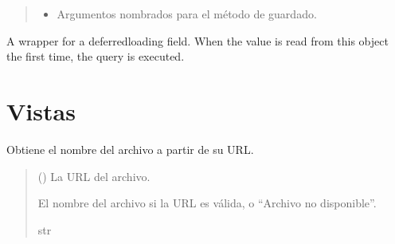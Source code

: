 \documentclass[letterpaper,10pt,spanish]{sphinxmanual}
\begin{document}
\begin{fulllineitems}
\begin{fulllineitems}
\begin{quote}
\begin{description}
\begin{itemize}
\item {} 
\sphinxAtStartPar
{} \textendash{} Argumentos nombrados para el método de guardado.

\end{itemize}

\end{description}\end{quote}

\end{fulllineitems}



\begin{fulllineitems}

\pysigstartsignatures
{}
\pysigstopsignatures
\sphinxAtStartPar
A wrapper for a deferred\sphinxhyphen{}loading field. When the value is read from this
object the first time, the query is executed.

\end{fulllineitems}


\end{fulllineitems}



\section{Vistas}
\label{\detokenize{normativa:vistas}}

\begin{fulllineitems}

\pysigstartsignatures
{}
\pysigstopsignatures
\sphinxAtStartPar
Obtiene el nombre del archivo a partir de su URL.
\begin{quote}\begin{description}
\sphinxAtStartPar
{} () \textendash{} La URL del archivo.

\sphinxAtStartPar
El nombre del archivo si la URL es válida, o “Archivo no disponible”.

\sphinxAtStartPar
str

\end{description}\end{quote}

\end{fulllineitems}
\end{document}

